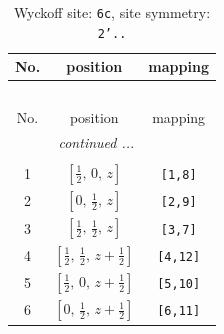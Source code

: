 \documentclass[fleqn,8pt]{jsarticle}
\begin{document}
\renewcommand{\arraystretch}{1.2}
\begin{longtable}{ccc}
\caption{Wyckoff site: {\tt 6c}, site symmetry: {\tt 2'..}}
 \\
 \hline \hline
No. & position & mapping \\ \hline \endfirsthead

\multicolumn{2}{l}{\tablename\ \thetable{}} \\
 \hline \hline
No. & position & mapping \\ \hline \endhead

 \hline \hline
\multicolumn{2}{r}{\footnotesize\it continued ...} \\ \endfoot

 \hline \hline
\multicolumn{2}{r}{} \\ \endlastfoot

1 & $\left[ \frac{1}{2},\, 0,\, z \right]$ & {\tt [1,8]} \\ \hline
2 & $\left[ 0,\, \frac{1}{2},\, z \right]$ & {\tt [2,9]} \\ \hline
3 & $\left[ \frac{1}{2},\, \frac{1}{2},\, z \right]$ & {\tt [3,7]} \\ \hline
4 & $\left[ \frac{1}{2},\, \frac{1}{2},\, z + \frac{1}{2} \right]$ & {\tt [4,12]} \\ \hline
5 & $\left[ \frac{1}{2},\, 0,\, z + \frac{1}{2} \right]$ & {\tt [5,10]} \\ \hline
6 & $\left[ 0,\, \frac{1}{2},\, z + \frac{1}{2} \right]$ & {\tt [6,11]} \\
\end{longtable}
\renewcommand{\arraystretch}{1.2}
\end{document}
